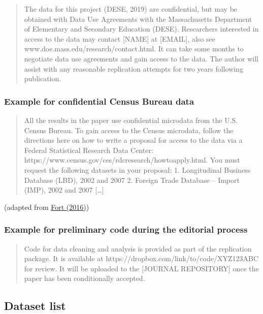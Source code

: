 \documentclass[
]{article}
\begin{document}
\begin{quote}
The data for this project (DESE, 2019) are confidential, but may be
obtained with Data Use Agreements with the Massachusetts Department of
Elementary and Secondary Education (DESE). Researchers interested in
access to the data may contact {[}NAME{]} at {[}EMAIL{]}, also see
www.doe.mass.edu/research/contact.html. It can take some months to
negotiate data use agreements and gain access to the data. The author
will assist with any reasonable replication attempts for two years
following publication.
\end{quote}

\hypertarget{example-for-confidential-census-bureau-data}{%
\subsubsection{Example for confidential Census Bureau
data}\label{example-for-confidential-census-bureau-data}}

\begin{quote}
All the results in the paper use confidential microdata from the U.S.
Census Bureau. To gain access to the Census microdata, follow the
directions here on how to write a proposal for access to the data via a
Federal Statistical Research Data Center:
https://www.census.gov/ces/rdcresearch/howtoapply.html. You must request
the following datasets in your proposal: 1. Longitudinal Business
Database (LBD), 2002 and 2007 2. Foreign Trade Database -- Import (IMP),
2002 and 2007 {[}\ldots{]}
\end{quote}

(adapted from \href{https://doi.org/10.1093/restud/rdw057}{Fort (2016)})

\hypertarget{example-for-preliminary-code-during-the-editorial-process}{%
\subsubsection{Example for preliminary code during the editorial
process}\label{example-for-preliminary-code-during-the-editorial-process}}

\begin{quote}
Code for data cleaning and analysis is provided as part of the
replication package. It is available at
https://dropbox.com/link/to/code/XYZ123ABC for review. It will be
uploaded to the {[}JOURNAL REPOSITORY{]} once the paper has been
conditionally accepted.
\end{quote}

\hypertarget{dataset-list}{%
\subsection{Dataset list}\label{dataset-list}}
\end{document}
